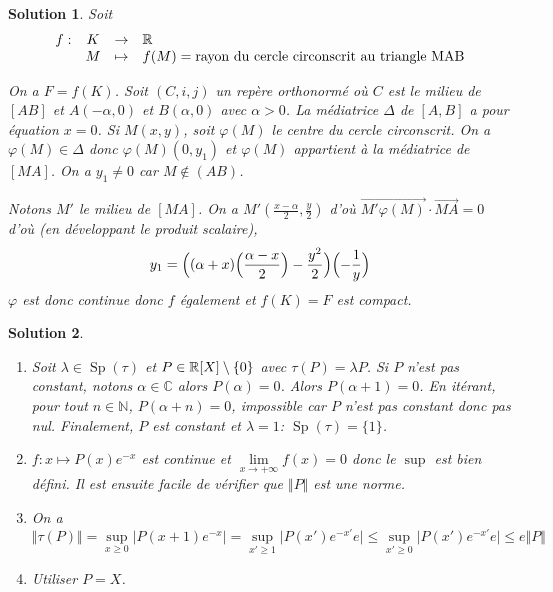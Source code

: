 \documentclass[12pt]{article}
\newtheorem{solution}{Solution}[section]
\theoremstyle{remark}
\newcommand{\C}{\mathbb{C}} \newcommand{\Q}{\mathbb{Q}}
\newcommand{\N}{\mathbb{N}} \newcommand{\Z}{\mathbb{Z}}
\DeclareMathOperator{\Sp}{Sp} \DeclareMathOperator{\mat}{mat}
\newcommand{\function}[5]{
	$$
	\begin{array}{rccl}
		#1: & #2 & \to & #3 \\
		& #4 & \mapsto & #5
	\end{array}
	$$
}
\numberwithin{equation}{section}
\begin{document}
\begin{solution}
	Soit \function{f}{K}{\R}{M}{f(M)=\text{rayon du cercle circonscrit au triangle MAB}}
	On a $F=f(K)$. Soit $(C,i,j)$ un repère orthonormé où $C$ est le milieu de $[AB]$ et $A(-\alpha,0)$ et $B(\alpha,0)$ avec $\alpha>0$. La médiatrice $\Delta$ de $[A,B]$ a pour équation $x=0$. Si $M(x,y)$, soit $\varphi(M)$ le centre du cercle circonscrit. On a $\varphi(M)\in\Delta$ donc $\varphi(M)(0,y_{1})$ et $\varphi(M)$ appartient à la médiatrice de $[MA]$. On a $y_{1}\neq0$ car $M\notin(AB)$.

	Notons $M'$ le milieu de $[MA]$. On a $M'(\frac{x-\alpha}{2},\frac{y}{2})$ d'où $\vec{M'\varphi(M)}\cdot\vec{MA}=0$ d'où (en développant le produit scalaire),
	$$y_{1}=\Bigl((\alpha+x)\Bigl(\frac{\alpha-x}{2}\Bigr)-\frac{y^{2}}{2}\Bigr)\Bigl(-\frac{1}{y}\Bigr)$$
	$\varphi$ est donc continue donc $f$ également et $f(K)=F$ est compact.
\end{solution}

\begin{solution}
	\phantom{}
	\begin{enumerate}
		\item Soit $\lambda\in\Sp(\tau)$ et $P\in\mathbb{R}[X]\setminus\{0\}$ avec $\tau(P)=\lambda P$. Si $P$ n'est pas constant, notons $\alpha\in\C$ alors $P(\alpha)=0$. Alors $P(\alpha+1)=0$. En itérant, pour tout $n\in\N$, $P(\alpha+n)=0$, impossible car $P$ n'est pas constant donc pas nul. Finalement, $P$ est constant et $\lambda=1$: $\Sp(\tau)=\{1\}$.
		\item $f\colon x\mapsto P(x)e^{-x}$ est continue et $\lim\limits_{x\to+\infty}f(x)=0$ donc le $\sup$ est bien défini. Il est ensuite facile de vérifier que $\Vert P\Vert$ est une norme.
		\item On a 
		$$\Vert\tau(P)\Vert=\sup\limits_{x\geqslant0}\vert P(x+1)e^{-x}\vert=\sup\limits_{x'\geqslant1}\vert P(x')e^{-x'}e\vert\leqslant\sup\limits_{x'\geqslant0}\vert P(x')e^{-x'}e\vert\leqslant e\Vert P\Vert$$
		\item Utiliser $P=X$.
	\end{enumerate}
\end{solution}
\end{document}
